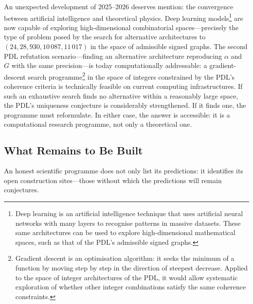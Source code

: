 \documentclass[12pt, a4paper, openright]{book}
\begin{document}
An unexpected development of 2025--2026 deserves mention: the convergence between artificial intelligence and theoretical physics. Deep learning models\footnote{Deep learning is an artificial intelligence technique that uses artificial neural networks with many layers to recognise patterns in massive datasets. These same architectures can be used to explore high-dimensional mathematical spaces, such as that of the PDL's admissible signed graphs.} are now capable of exploring high-dimensional combinatorial spaces---precisely the type of problem posed by the search for alternative architectures to $(24, 28, 930, 10\,087, 11\,017)$ in the space of admissible signed graphs. The second PDL refutation scenario---finding an alternative architecture reproducing $\alpha$ and $G$ with the same precision---is today computationally addressable: a gradient-descent search programme\footnote{Gradient descent is an optimisation algorithm: it seeks the minimum of a function by moving step by step in the direction of steepest decrease. Applied to the space of integer architectures of the PDL, it would allow systematic exploration of whether other integer combinations satisfy the same coherence constraints.} in the space of integers constrained by the PDL's coherence criteria is technically feasible on current computing infrastructures. If such an exhaustive search finds no alternative within a reasonably large space, the PDL's uniqueness conjecture is considerably strengthened. If it finds one, the programme must reformulate. In either case, the answer is accessible: it is a computational research programme, not only a theoretical one.

\subsection*{What Remains to Be Built}

An honest scientific programme does not only list its predictions: it identifies its open construction sites---those without which the predictions will remain conjectures.
\end{document}
